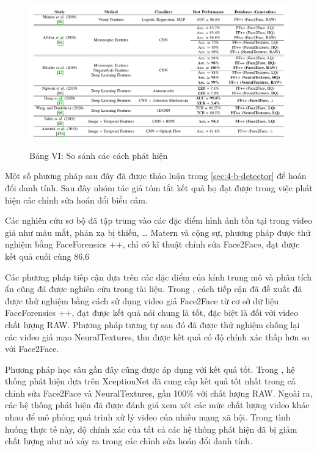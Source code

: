 \documentclass{article}
\begin{document}
\begin{figure}[h!]
\caption{Bảng VI: So sánh các cách phát hiện}
\includegraphics[width=\textwidth]{table-6-compare}
\label{table-6-compare}
\end{figure}

Một số phương pháp sau đây đã được thảo luận trong \ref{sec:4-b-detector} để hoán đổi danh tính. Sau đây nhóm tác giả tóm tắt kết quả họ đạt được trong việc phát hiện các chỉnh sửa hoán đổi biểu cảm.

Các nghiên cứu sơ bộ đã tập trung vào các đặc điểm hình ảnh tồn tại trong video giả như màu mắt, phản xạ bị thiếu, … Matern và cộng sự, phương pháp được thử nghiệm bằng FaceForensics ++, chỉ có kĩ thuật chỉnh sửa Face2Face, đạt được kết quả cuối cùng 86,6%

Các phương pháp tiếp cận dựa trên các đặc điểm của kính trung mô và phân tích ẩn cũng đã được nghiên cứu trong tài liệu. Trong , cách tiếp cận đã đề xuất đã được thử nghiệm bằng cách sử dụng video giả Face2Face từ cơ sở dữ liệu FaceForensics ++, đạt được kết quả nói chung là tốt, đặc biệt là đối với video chất lượng RAW. Phương pháp tương tự sau đó đã được thử nghiệm chống lại các video giả mạo NeuralTextures, thu được kết quả có độ chính xác thấp hơn so với Face2Face.

Phương pháp học sâu gần đây cũng được áp dụng với kết quả tốt. Trong , hệ thống phát hiện dựa trên XceptionNet đã cung cấp kết quả tốt nhất trong cả chỉnh sửa Face2Face và NeuralTextures, gần 100\% với chất lượng RAW. Ngoài ra, các hệ thống phát hiện đã được đánh giá xem xét các mức chất lượng video khác nhau để mô phỏng quá trình xử lý video của nhiều mạng xã hội. Trong tình huống thực tế này, độ chính xác của tất cả các hệ thống phát hiện đã bị giảm chất lượng như nó xảy ra trong các chỉnh sửa hoán đổi danh tính.
\end{document}
